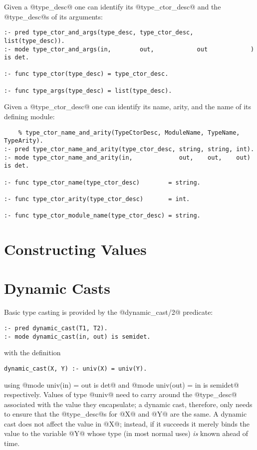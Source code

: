 Given a @type_desc@ one can identify its @type_ctor_desc@ and the
@type_desc@s of its arguments:
\begin{verbatim}
:- pred type_ctor_and_args(type_desc, type_ctor_desc, list(type_desc)).
:- mode type_ctor_and_args(in,        out,            out            ) is det.

:- func type_ctor(type_desc) = type_ctor_desc.

:- func type_args(type_desc) = list(type_desc).
\end{verbatim}

Given a @type_ctor_desc@ one can identify its name, arity, and the name
of its defining module:
\begin{verbatim}
    % type_ctor_name_and_arity(TypeCtorDesc, ModuleName, TypeName, TypeArity).
:- pred type_ctor_name_and_arity(type_ctor_desc, string, string, int).
:- mode type_ctor_name_and_arity(in,             out,    out,    out) is det.

:- func type_ctor_name(type_ctor_desc)        = string.

:- func type_ctor_arity(type_ctor_desc)       = int.

:- func type_ctor_module_name(type_ctor_desc) = string.
\end{verbatim}

\section{Constructing Values}

\section{Dynamic Casts}

Basic type casting is provided by the @dynamic_cast/2@ predicate:
\begin{verbatim}
:- pred dynamic_cast(T1, T2).
:- mode dynamic_cast(in, out) is semidet.
\end{verbatim}
with the definition
\begin{verbatim}
dynamic_cast(X, Y) :- univ(X) = univ(Y).
\end{verbatim}
using @mode univ(in) = out is det@ and @mode univ(out) = in is semidet@
respectively.  Values of type @univ@ need to carry around the
@type_desc@ associated with the value they encapsulate; a dynamic cast,
therefore, only needs to ensure that the @type_desc@s for @X@ and @Y@
are the same.    A dynamic cast does not affect
the value in @X@; instead, if it succeeds it merely binds the value to
the variable @Y@ whose type (in most normal uses) \emph{is} known ahead
of time.

